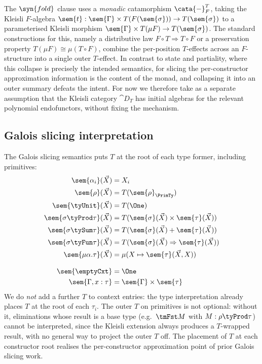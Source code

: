 The $\syn{fold}$ clause uses a \emph{monadic} catamorphism $\cata{-}_F^T$, taking the Kleisli
$F$-algebra $\sem{t} : \sem{\Gamma} \times T(F(\sem{\sigma})) \to T(\sem{\sigma})$ to a
parameterised Kleisli morphism $\sem{\Gamma} \times T(\mu F) \to T(\sem{\sigma})$. The standard
constructions for this, namely a distributive law $F \circ T \Rightarrow T \circ F$ or a
preservation property $T(\mu F) \cong \mu(T \circ F)$, combine the per-position $T$-effects
across an $F$-structure into a single outer $T$-effect. In contrast to state and partiality,
where this collapse is precisely the intended semantics, for slicing the per-constructor
approximation information is the content of the monad, and collapsing it into an outer summary
defeats the intent. For now we therefore take as a separate assumption that the Kleisli category
$\cat{D}_T$ has initial algebras for the relevant polynomial endofunctors, without fixing the
mechanism.

\subsection{Galois slicing interpretation}
\label{sec:slicing-interpretation:galois}

The Galois slicing semantics puts $T$ at the root of each type former, including primitives:
\begin{align*}
\sem{\alpha_i}(\vec{X})            & = X_i \\
\sem{\rho}(\vec{X})                & = T(\sem{\rho}_{\PrimTy}) \\
\sem{\tyUnit}(\vec{X})             & = T(\One) \\
\sem{\sigma \tyProd \tau}(\vec{X}) & = T(\sem{\sigma}(\vec{X}) \times \sem{\tau}(\vec{X})) \\
\sem{\sigma \tySum \tau}(\vec{X})  & = T(\sem{\sigma}(\vec{X}) + \sem{\tau}(\vec{X})) \\
\sem{\sigma \tyFun \tau}(\vec{X})  & = T(\sem{\sigma}(\vec{X}) \Rightarrow \sem{\tau}(\vec{X})) \\
\sem{\mu\alpha.\tau}(\vec{X})      & = \mu(X \mapsto \sem{\tau}(\vec{X}, X)) \\[3mm]
\sem{\emptyCxt}                    & = \One \\
\sem{\Gamma, x : \tau}             & = \sem{\Gamma} \times \sem{\tau}
\end{align*}
We do \emph{not} add a further $T$ to context entries: the type interpretation already places $T$
at the root of each $\tau_i$. The outer $T$ on primitives is not optional: without it,
eliminations whose result is a base type (e.g.\ $\tmFst M$ with $M : \rho \tyProd \tau$) cannot be
interpreted, since the Kleisli extension always produces a $T$-wrapped result, with no general
way to project the outer $T$ off. The placement of $T$ at each constructor root realises
the per-constructor approximation point of prior Galois slicing work.

